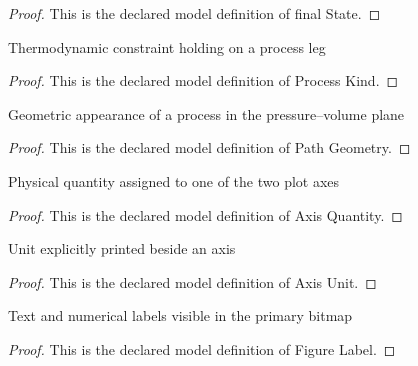 \begin{proof}
  This is the declared model definition of final State.
\end{proof}
\begin{definition}
  \label{def:physics:phyx-mini-0427:phyxminiproblems-problemphyxmini0427-processkind}
  Thermodynamic constraint holding on a process leg
\end{definition}
\begin{proof}
  This is the declared model definition of Process Kind.
\end{proof}
\begin{definition}
  \label{def:physics:phyx-mini-0427:phyxminiproblems-problemphyxmini0427-pathgeometry}
  Geometric appearance of a process in the pressure--volume plane
\end{definition}
\begin{proof}
  This is the declared model definition of Path Geometry.
\end{proof}
\begin{definition}
  \label{def:physics:phyx-mini-0427:phyxminiproblems-problemphyxmini0427-axisquantity}
  Physical quantity assigned to one of the two plot axes
\end{definition}
\begin{proof}
  This is the declared model definition of Axis Quantity.
\end{proof}
\begin{definition}
  \label{def:physics:phyx-mini-0427:phyxminiproblems-problemphyxmini0427-axisunit}
  Unit explicitly printed beside an axis
\end{definition}
\begin{proof}
  This is the declared model definition of Axis Unit.
\end{proof}
\begin{definition}
  \label{def:physics:phyx-mini-0427:phyxminiproblems-problemphyxmini0427-figurelabel}
  Text and numerical labels visible in the primary bitmap
\end{definition}
\begin{proof}
  This is the declared model definition of Figure Label.
\end{proof}
